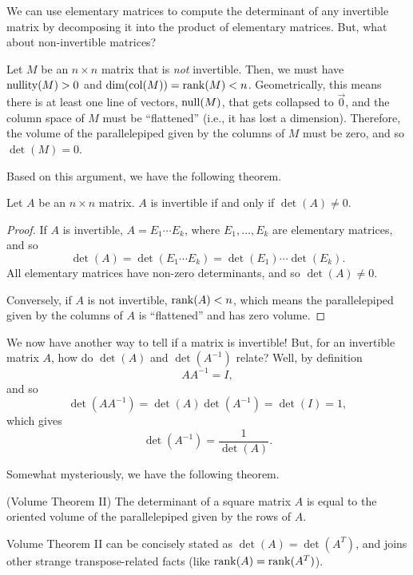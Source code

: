 
We can use elementary matrices to compute the determinant of any invertible matrix by
decomposing it into the product of elementary matrices. But, what about non-invertible matrices?

Let $M$ be an $n\times n$ matrix that is \emph{not} invertible. Then, we must have $\operatorname{nullity}(M)>0$
and $\operatorname{dim}(\operatorname{col}(M))=\operatorname{rank}(M)<n$. Geometrically, this means there is at least one line of vectors, $\operatorname{null}(M)$, that gets
collapsed to $\vec 0$, and the column space of $M$ must be ``flattened'' (i.e., it has lost a dimension). 
Therefore, the volume of the parallelepiped given by the columns of $M$ must be zero, and so $\det(M)=0$.

Based on this argument, we have the following theorem.
\begin{theorem}
	Let $A$ be an $n\times n$ matrix. $A$ is invertible if and only if $\det(A)\neq 0$.
\end{theorem}
\begin{proof}
	If $A$ is invertible, $A=E_1\cdots E_k$, where $E_1,\ldots,E_k$ are elementary matrices,
	and so
	\[
		\det(A)=\det(E_1\cdots E_k) = \det(E_1)\cdots \det(E_k).
	\]
	All elementary matrices have non-zero determinants,
	and so $\det(A)\neq 0$.

	Conversely, if $A$ is not invertible, $\operatorname{rank}(A)<n$, which means the parallelepiped 
	given by the columns of $A$ is ``flattened'' and has zero volume.
\end{proof}

We now have another way to tell if a matrix is invertible! But, for an invertible matrix $A$,
how do $\det(A)$ and $\det(A^{-1})$ relate?  Well, by definition
\[
	AA^{-1}=I,
\]
and so
\[
	\det(AA^{-1})=\det(A)\det(A^{-1})=
	\det(I)=1,
\]
which gives
\[
	\det(A^{-1})=\frac{1}{\det(A)}.
\]


Somewhat mysteriously, we have the following theorem.
\begin{theorem}(Volume Theorem II)
	The determinant of a square matrix $A$ is equal to the oriented volume of the parallelepiped
	given by the rows of $A$.
\end{theorem}

Volume Theorem II can be concisely stated as $\det(A)=\det(A^T)$, and joins other
strange transpose-related facts (like $\operatorname{rank}(A)=\operatorname{rank}(A^T)$).

